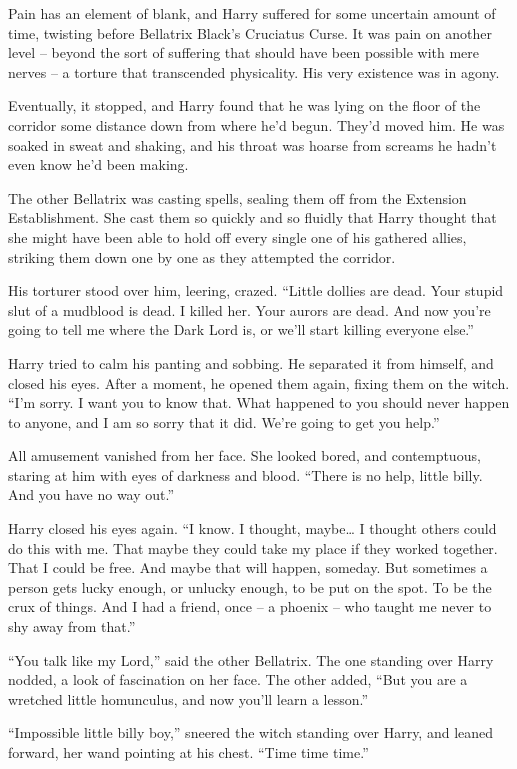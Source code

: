 Pain has an element of blank, and Harry suffered for some uncertain
amount of time, twisting before Bellatrix Black's Cruciatus Curse. It
was pain on another level -- beyond the sort of suffering that should
have been possible with mere nerves -- a torture that transcended
physicality. His very existence was in agony.

Eventually, it stopped, and Harry found that he was lying on the floor
of the corridor some distance down from where he'd begun. They'd moved
him. He was soaked in sweat and shaking, and his throat was hoarse from
screams he hadn't even know he'd been making.

The other Bellatrix was casting spells, sealing them off from the
Extension Establishment. She cast them so quickly and so fluidly that
Harry thought that she might have been able to hold off every single one
of his gathered allies, striking them down one by one as they attempted
the corridor.

His torturer stood over him, leering, crazed. ``Little dollies are dead.
Your stupid slut of a mudblood is dead. I killed her. Your aurors are
dead. And now you're going to tell me where the Dark Lord is, or we'll
start killing everyone else.''

Harry tried to calm his panting and sobbing. He separated it from
himself, and closed his eyes. After a moment, he opened them again,
fixing them on the witch. ``I'm sorry. I want you to know that. What
happened to you should never happen to anyone, and I am so sorry that it
did. We're going to get you help.''

All amusement vanished from her face. She looked bored, and
contemptuous, staring at him with eyes of darkness and blood. ``There is
no help, little billy. And you have no way out.''

Harry closed his eyes again. ``I know. I thought, maybe\ldots{} I
thought others could do this with me. That maybe they could take my
place if they worked together. That I could be free. And maybe that will
happen, someday. But sometimes a person gets lucky enough, or unlucky
enough, to be put on the spot. To be the crux of things. And I had a
friend, once -- a phoenix -- who taught me never to shy away from
that.''

``You talk like my Lord,'' said the other Bellatrix. The one standing
over Harry nodded, a look of fascination on her face. The other added,
``But you are a wretched little homunculus, and now you'll learn a
lesson.''

``Impossible little billy boy,'' sneered the witch standing over Harry,
and leaned forward, her wand pointing at his chest. ``Time time time.''

